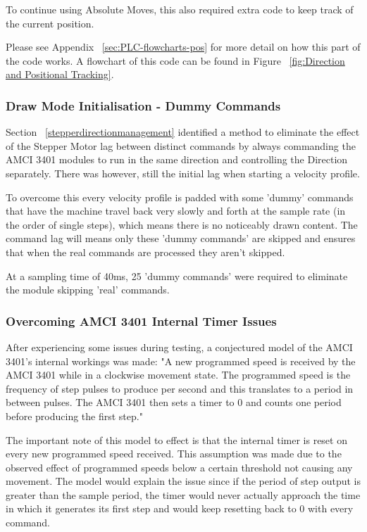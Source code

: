 			To continue using Absolute Moves, this also required extra code to keep track of the current position.
			
			Please see Appendix ~\ref{sec:PLC-flowcharts-pos} for more detail on how this part of the code works. A flowchart of this code can be found in Figure ~\ref{fig:Direction and Positional Tracking}.
			
	\subsubsection{Draw Mode Initialisation - Dummy Commands}
			Section ~\ref{stepperdirectionmanagement} identified a method to eliminate the effect of the Stepper Motor lag between distinct commands by always commanding the AMCI 3401 modules to run in the same direction and controlling the Direction separately. There was however, still the initial lag when starting a velocity profile.
			
			To overcome this every velocity profile is padded with some 'dummy' commands that have the machine travel back very slowly and forth at the sample rate  (in the order of single steps), which means there is no noticeably drawn content. The command lag will means only these 'dummy commands' are skipped and ensures that when the real commands are processed they aren't skipped.
			
			At a sampling time of 40ms, 25 'dummy commands' were required to eliminate the module skipping 'real' commands.

	\subsubsection{Overcoming AMCI 3401 Internal Timer Issues}
			After experiencing some issues during testing, a conjectured model of the AMCI 3401's internal workings was made: "A new programmed speed is received by the AMCI 3401 while in a clockwise movement state. The programmed speed is the frequency of step pulses to produce per second and this translates to a period in between pulses. The AMCI 3401 then sets a timer to 0 and counts one period before producing the first step."
			
			The important note of this model to effect is that the internal timer is reset on every new programmed speed received. This assumption was made due to the observed effect of programmed speeds below a certain threshold not causing any movement. The model would explain the issue since if the period of step output is greater than the sample period, the timer would never actually approach the time in which it generates its first step and would keep resetting back to 0 with every command.
			

